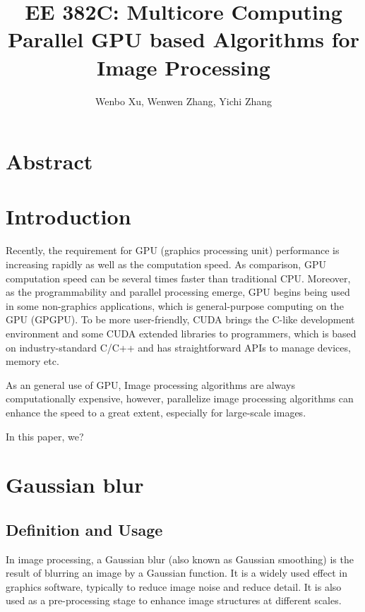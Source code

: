 \documentclass[journal,12pt,onecolumn,draftclsnofoot]{ieeeconf}  %
\author{Wenbo Xu, Wenwen Zhang, Yichi Zhang}
\title{
	EE 382C: Multicore Computing \protect\\
	\Large \bf Parallel GPU based Algorithms for Image Processing
}
\begin{document}
\maketitle
\thispagestyle{empty}
\pagestyle{empty}


\section{Abstract}
  

\section{Introduction}
Recently, the requirement for GPU (graphics processing unit) performance is increasing rapidly as well as the computation speed. As comparison, GPU computation speed can be several times faster than traditional CPU. Moreover, as the programmability and parallel processing emerge\cite{1}, GPU begins being used in some non-graphics applications, which is general-purpose computing on the GPU (GPGPU). To be more user-friendly, CUDA brings the C-like development 
environment and some CUDA extended libraries to programmers, which is based on industry-standard C/C++ and has straightforward APIs to manage devices, memory etc.

As an general use of GPU, Image processing algorithms are always computationally expensive, however, parallelize image processing algorithms can enhance the speed to a great extent, especially for large-scale images.

In this paper, we?

\section{Gaussian blur}
\subsection{Definition and Usage}
In image processing, a Gaussian blur (also known as Gaussian smoothing) is the result of blurring an image by a Gaussian function. It is a widely used effect in graphics software, typically to reduce image noise and reduce detail. It is also used as a pre-processing stage to enhance image structures at different scales. 
\end{document}
